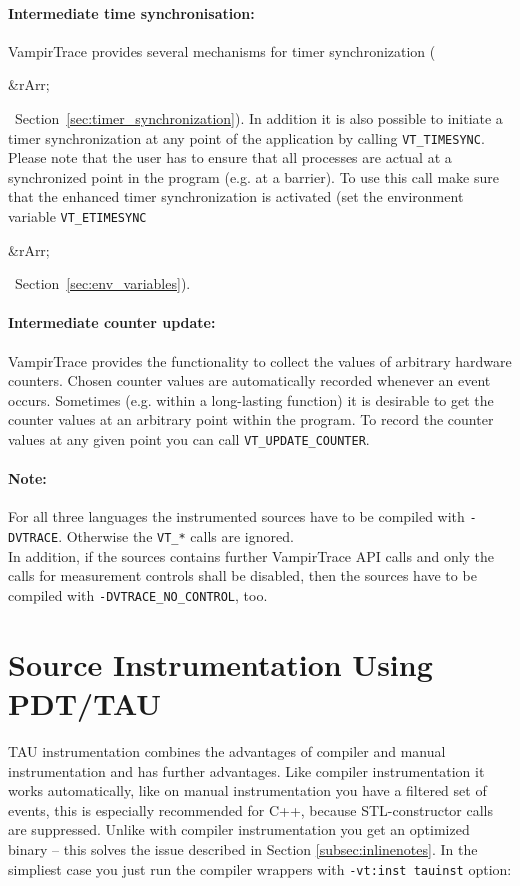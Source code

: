 \documentclass[a4paper,twoside,12pt,BCOR12mm]{scrbook}
\newcommand{\rarr}{$\Rightarrow$}  %
\renewcommand{\rarr}{\begin{rawhtml}&rArr;\end{rawhtml}}   %
\begin{document}
\paragraph{Intermediate time synchronisation:}
  VampirTrace provides several mechanisms for timer synchronization (\rarr\
  Section~\ref{sec:timer_synchronization}). In addition it is also possible to
  initiate a timer synchronization at any point of the application by calling
  \texttt{VT\_TIMESYNC}. Please note that the user has to ensure that all
  processes are actual at a synchronized point in the program (e.g. at a barrier).
  To use this call make sure that the enhanced timer synchronization is activated
  (set the environment variable \texttt{VT\_ETIMESYNC} \rarr\ Section~\ref{sec:env_variables}). 

\paragraph{Intermediate counter update:} 
  VampirTrace provides the functionality to collect the values of arbitrary
  hardware counters. Chosen counter values are automatically recorded whenever
  an event occurs. Sometimes (e.g. within a long-lasting function) it is desirable
  to get the counter values at an arbitrary point within the program. To record
  the counter values at any given point you can call \texttt{VT\_UPDATE\_COUNTER}.

\paragraph{Note:}
  For all three languages the instrumented sources have to be compiled 
  with \texttt{-DVTRACE}. Otherwise the \texttt{VT\_*} calls are ignored.\\
  In addition, if the sources contains further VampirTrace API calls and only the
  calls for measurement controls shall be disabled, then the sources have to be
  compiled with \texttt{-DVTRACE\_NO\_CONTROL}, too.


\section{Source Instrumentation Using PDT/TAU}
\label{sec:tauinst}
  TAU instrumentation combines the advantages of compiler and manual instrumentation and has further advantages.
  Like compiler instrumentation it works automatically, like on manual instrumentation you have a filtered set of events,
  this is especially recommended for C++, because STL-constructor calls are suppressed.
  Unlike with compiler instrumentation you get an optimized binary -- this solves the issue described in Section \ref{subsec:inlinenotes}.
  In the simpliest case you just run the compiler wrappers with \texttt{-vt:inst tauinst} option:
\end{document}
